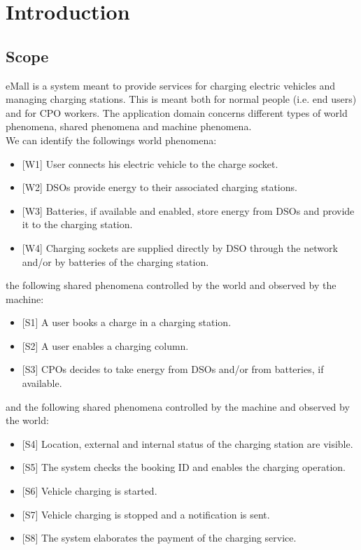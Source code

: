 \documentclass[a4paper]{report}
\begin{document}
\tableofcontents
\listoffigures
\begingroup
\let\clearpage\relax %
\listoftables
\endgroup
\restoregeometry
\chapter{Introduction}
\section{Scope}
eMall is a system meant to provide services for charging electric vehicles and managing charging stations. This is meant both for normal people (i.e. end users) and for CPO workers. 
The application domain concerns different types of world phenomena, shared phenomena and machine phenomena. \\
We can identify the followings world phenomena:
\begin{itemize}
\item {[W1]} \label{W1}User connects his electric vehicle to the charge socket.
\item {[W2]} \label{W2}DSOs provide energy to their associated charging stations.
\item {[W3]} \label{W3}Batteries, if available and enabled, store energy from DSOs and provide it to the charging station.
\item {[W4]} \label{W4}Charging sockets are supplied directly by DSO through the network and/or by batteries of the charging station.
\end{itemize} 
the following shared phenomena controlled by the world and observed by the machine:
\begin{itemize}
\item {[S1]} A user books a charge in a charging station.
\item {[S2]} A user enables a charging column.
\item {[S3]} CPOs decides to take energy from DSOs and/or from batteries, if available.
\end{itemize}
and the following shared phenomena controlled by the machine and observed by the world:
\begin{itemize}
\item {[S4]} Location, external and internal status of the charging station are visible.
\item {[S5]} The system checks the booking ID and enables the charging operation.
\item {[S6]} Vehicle charging is started.
\item {[S7]} Vehicle charging is stopped and a notification is sent.
\item {[S8]} The system elaborates the payment of the charging service.
\end{itemize}
\end{document}
